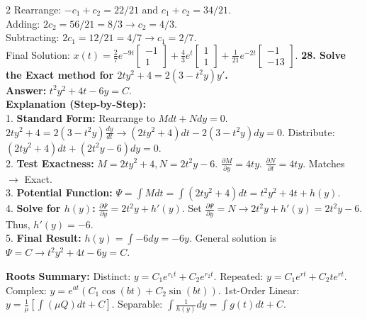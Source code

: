 \documentclass[4pt]{extarticle}
\begin{document}
\begin{multicols}{2}
Rearrange: $-c_1 + c_2 = 22/21$ and $c_1 + c_2 = 34/21$. \\
Adding: $2c_2 = 56/21 = 8/3 \rightarrow c_2 = 4/3$. \\
Subtracting: $2c_1 = 12/21 = 4/7 \rightarrow c_1 = 2/7$. \\
Final Solution: $x(t) = \frac{2}{7}e^{-9t}\begin{bmatrix} -1 \\ 1 \end{bmatrix} + \frac{4}{3}e^t\begin{bmatrix} 1 \\ 1 \end{bmatrix} + \frac{1}{21}e^{-2t}\begin{bmatrix} -1 \\ -13 \end{bmatrix}$.
\textbf{28. Solve the Exact method for $2ty^2 + 4 = 2(3 - t^2 y) y'$.} \\
\textbf{Answer:} $t^2 y^2 + 4t - 6y = C$. \\
\textbf{Explanation (Step-by-Step):} \\
1. \textbf{Standard Form:} Rearrange to $M dt + N dy = 0$. $2ty^2 + 4 = 2(3 - t^2 y) \frac{dy}{dt} \rightarrow (2ty^2 + 4) dt - 2(3 - t^2 y) dy = 0$. Distribute: $(2ty^2 + 4) dt + (2t^2 y - 6) dy = 0$. \\
2. \textbf{Test Exactness:} $M = 2ty^2 + 4, N = 2t^2 y - 6$. $\frac{\partial M}{\partial y} = 4ty$. $\frac{\partial N}{\partial t} = 4ty$. Matches $\rightarrow$ Exact. \\
3. \textbf{Potential Function:} $\Psi = \int M dt = \int (2ty^2 + 4) dt = t^2 y^2 + 4t + h(y)$. \\
4. \textbf{Solve for $h(y)$:} $\frac{\partial \Psi}{\partial y} = 2t^2 y + h'(y)$. Set $\frac{\partial \Psi}{\partial y} = N \rightarrow 2t^2 y + h'(y) = 2t^2 y - 6$. Thus, $h'(y) = -6$. \\
5. \textbf{Final Result:} $h(y) = \int -6 dy = -6y$. General solution is $\Psi = C \rightarrow t^2 y^2 + 4t - 6y = C$.

\textbf{Roots Summary:} Distinct: $y = C_1e^{r_1t} + C_2e^{r_2t}$. Repeated: $y = C_1e^{rt} + C_2te^{rt}$. Complex: $y = e^{at}(C_1 \cos(bt) + C_2 \sin(bt))$. 1st-Order Linear: $y = \frac{1}{\mu} [\int (\mu Q) dt + C]$. Separable: $\int \frac{1}{h(y)} dy = \int g(t) dt + C$.


\end{multicols}
\end{document}
